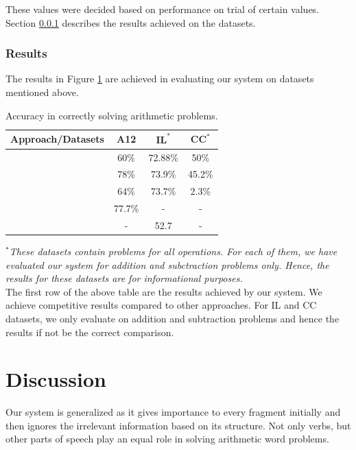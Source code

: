 \documentclass[11pt]{article}
\begin{document}
These values were decided based on performance on trial of certain values. Section \ref{sec:results} describes the results achieved on the datasets.

\subsubsection{Results}\label{sec:results}

The results in Figure \ref{figure:24} are achieved in evaluating our system on datasets mentioned above. 

\begin{table}[h!]
\begin{center}
\begin{tabular}{|c|c|c|c|}
\hline
\textbf{Approach/Datasets} & \textbf{A12} & $\textbf{IL}^{*}$ & $\textbf{CC}^{*}$ \\
\hline
 & 60\% & 72.88\% & 50\% \\
\hline
~\citep{RoyR15} & 78\% & 73.9\% & 45.2\% \\
\hline
~\citep{Kushman} & 64\% & 73.7\% & 2.3\% \\
\hline
~\citep{ARIS} & 77.7\% & - & - \\
\hline
~\citep{RoyTACL15} & - & 52.7 & - \\
\hline
\end{tabular}
\end{center}
\caption{Accuracy in correctly solving arithmetic problems.}
\label{figure:24}
\end{table}

\textit{$^{*}$These datasets contain problems for all operations. For each of them, we have evaluated our system for addition and subctraction problems only. Hence, the results for these datasets are for informational purposes.}\\

The first row of the above table are the results achieved by our system. We achieve competitive results compared to other approaches. For IL and CC datasets, we only evaluate on addition and subtraction problems and hence the results if not be the correct comparison.

\section{Discussion}\label{sec:discussion}

Our system is generalized as it gives importance to every fragment initially and then ignores the irrelevant information based on its structure. Not only verbs\citep{ARIS}, but other parts of speech play an equal role in solving arithmetic word problems. 
\end{document}
